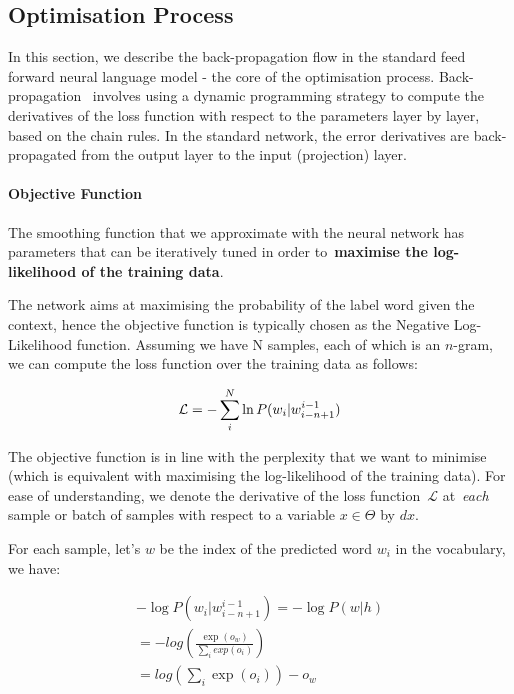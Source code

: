 \subsection{Optimisation Process}
In this section, we describe the back-propagation flow in the standard feed forward neural language model - the core of the optimisation process. Back-propagation~\cite{rumelhart1985learning} involves using a dynamic programming strategy to compute the derivatives of the loss function with respect to the parameters layer by layer, based on the chain rules. In the standard network, the error derivatives are back-propagated from the output layer to the input (projection) layer.

\paragraph{Objective Function}

The smoothing function that we approximate with the neural network has parameters that can be iteratively tuned in order to~\textbf{maximise the log-likelihood of the training data}. 

The network aims at maximising the probability of the label word given the context, hence the objective function is typically chosen as the Negative Log-Likelihood function. Assuming we have N samples, each of which is an $n$-gram, we can compute the loss function over the training data as follows:

\begin{equation}
\mathcal{L} = - 	\sum_{i}^N \ln P( w_i | w_{i-n+1}^{i-1} ) \\
\label{eq:objective}
\end{equation}

The objective function is in line with the perplexity that we want to minimise (which is equivalent with maximising the log-likelihood of the training data). For ease of understanding, we denote the derivative of the loss function~$\mathcal{L}$ at~\textit{each} sample or batch of samples with respect to a variable $x \in \Theta$ by $dx$.  

For each sample, let's $w$ be the index of the predicted word $w_i$ in the vocabulary, we have:

\begin{equation}
\begin{aligned}
- \log P(w_i |  w_{i-n+1}^{i-1})  = - \log P(w | h) \\
= - log (\frac{\exp (o_w)}{\sum_i exp(o_i)}) \\
=  log(\sum_i \exp(o_i)) - o_w
\label{eq:objective2}
\end{aligned}
\end{equation}

